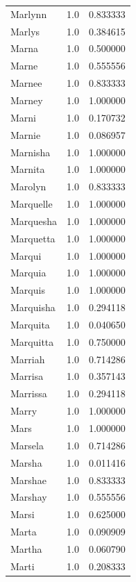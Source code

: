 \documentclass[
  letterpaper,
  DIV=11,
  numbers=noendperiod]{scrreprt}
\begin{document}
\begin{tabular}{lrr}
Marlynn         &   1.0 &   0.833333 \\
Marlys          &   1.0 &   0.384615 \\
Marna           &   1.0 &   0.500000 \\
Marne           &   1.0 &   0.555556 \\
Marnee          &   1.0 &   0.833333 \\
Marney          &   1.0 &   1.000000 \\
Marni           &   1.0 &   0.170732 \\
Marnie          &   1.0 &   0.086957 \\
Marnisha        &   1.0 &   1.000000 \\
Marnita         &   1.0 &   1.000000 \\
Marolyn         &   1.0 &   0.833333 \\
Marquelle       &   1.0 &   1.000000 \\
Marquesha       &   1.0 &   1.000000 \\
Marquetta       &   1.0 &   1.000000 \\
Marqui          &   1.0 &   1.000000 \\
Marquia         &   1.0 &   1.000000 \\
Marquis         &   1.0 &   1.000000 \\
Marquisha       &   1.0 &   0.294118 \\
Marquita        &   1.0 &   0.040650 \\
Marquitta       &   1.0 &   0.750000 \\
Marriah         &   1.0 &   0.714286 \\
Marrisa         &   1.0 &   0.357143 \\
Marrissa        &   1.0 &   0.294118 \\
Marry           &   1.0 &   1.000000 \\
Mars            &   1.0 &   1.000000 \\
Marsela         &   1.0 &   0.714286 \\
Marsha          &   1.0 &   0.011416 \\
Marshae         &   1.0 &   0.833333 \\
Marshay         &   1.0 &   0.555556 \\
Marsi           &   1.0 &   0.625000 \\
Marta           &   1.0 &   0.090909 \\
Martha          &   1.0 &   0.060790 \\
Marti           &   1.0 &   0.208333 \\

\end{tabular}
\end{document}
